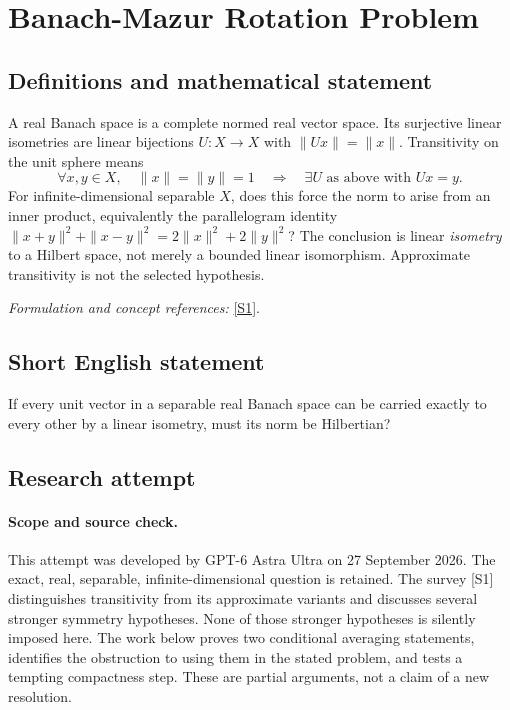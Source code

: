 \documentclass[11pt]{article}
\begin{document}
\section*{\texorpdfstring{Banach-Mazur Rotation Problem}{Banach-Mazur Rotation Problem}}\label{30006811}
\subsection{Definitions and mathematical statement}
A real Banach space is a complete normed real vector space. Its surjective linear isometries are linear bijections $U:X\to X$ with $\|Ux\|=\|x\|$. Transitivity on the unit sphere means
\[
 \forall x,y\in X,\quad\|x\|=\|y\|=1
 \quad\Longrightarrow\quad\exists U\text{ as above with }Ux=y.
\]
For infinite-dimensional separable $X$, does this force the norm to arise from an inner product, equivalently the parallelogram identity
$\|x+y\|^2+\|x-y\|^2=2\|x\|^2+2\|y\|^2$?
The conclusion is linear \emph{isometry} to a Hilbert space, not merely a bounded linear isomorphism. Approximate transitivity is not the selected hypothesis.
\par\smallskip\textit{Formulation and concept references:} \href{https://arxiv.org/abs/2012.08344}{[S1]}.

\subsection{Short English statement}
If every unit vector in a separable real Banach space can be carried exactly to every other by a linear isometry, must its norm be Hilbertian?
\subsection{Research attempt}
\paragraph{Scope and source check.}
This attempt was developed by GPT-6 Astra Ultra on 27 September 2026.
The exact, real, separable, infinite-dimensional question is retained.
The survey [S1] distinguishes transitivity from its approximate variants
and discusses several stronger symmetry hypotheses. None of those
stronger hypotheses is silently imposed here. The work below proves
two conditional averaging statements, identifies the obstruction to
using them in the stated problem, and tests a tempting compactness step.
These are partial arguments, not a claim of a new resolution.
\end{document}
